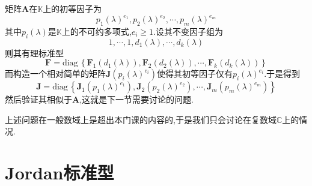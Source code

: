 矩阵$\bm{A}$在$\mathbb{K}$上的初等因子为\[
p_1\left(\lambda\right)^{e_1},p_2\left(\lambda\right)^{e_2},\cdots,p_m\left(\lambda\right)^{e_m}
\]其中$p_i\left(\lambda\right)$是$\mathbb{K}$上的不可约多项式,$e_i\geqslant 1.$设其不变因子组为\[
1,\cdots,1,d_1\left(\lambda\right),\cdots,d_k\left(\lambda\right)
\]则其有理标准型\[
\bm{F}=\mathrm{diag}\,\left\{
    \bm{F}_1\left(d_1\left(\lambda\right)\right),\bm{F}_2\left(d_2\left(\lambda\right)\right),\cdots,\bm{F}_k\left(d_k\left(\lambda\right)\right)
\right\}
\]而构造一个相对简单的矩阵$\bm{J}\left(p_i\left(\lambda\right)^{e_i}\right)$使得其初等因子仅有$p_i\left(\lambda\right)^{e_i}$.于是得到
\[
\bm{J}=\mathrm{diag}\,\left\{
    \bm{J}_1\left(p_1\left(\lambda\right)^{e_1}\right),\bm{J}_2\left(p_2\left(\lambda\right)^{e_2}\right),\cdots,\bm{J}_m\left(p_m\left(\lambda\right)^{e_m}\right)  
\right\}
\]然后验证其相似于$\bm{A}$,这就是下一节需要讨论的问题.
\begin{red}
\begin{remark}
    上述问题在一般数域上是超出本门课的内容的,于是我们只会讨论在复数域$\mathbb{C}$上的情况.
\end{remark}
\end{red}
\newpage
\section{Jordan标准型}
